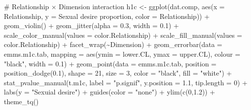 \documentclass[
  bookmarksnumbered]{article}
\newenvironment{Shaded}{\begin{snugshade}}{\end{snugshade}}
\newcommand{\AttributeTok}[1]{\textcolor[rgb]{0.80,0.80,0.80}{#1}}
\newcommand{\CommentTok}[1]{\textcolor[rgb]{0.50,0.62,0.50}{#1}}
\newcommand{\DecValTok}[1]{\textcolor[rgb]{0.86,0.86,0.80}{#1}}
\newcommand{\FloatTok}[1]{\textcolor[rgb]{0.75,0.75,0.82}{#1}}
\newcommand{\FunctionTok}[1]{\textcolor[rgb]{0.94,0.94,0.56}{#1}}
\newcommand{\NormalTok}[1]{\textcolor[rgb]{0.80,0.80,0.80}{#1}}
\newcommand{\OtherTok}[1]{\textcolor[rgb]{0.94,0.94,0.56}{#1}}
\newcommand{\SpecialCharTok}[1]{\textcolor[rgb]{0.86,0.64,0.64}{#1}}
\newcommand{\StringTok}[1]{\textcolor[rgb]{0.80,0.58,0.58}{#1}}
\begin{document}
\begin{Shaded}
\begin{Highlighting}[]
\CommentTok{\# Relationship × Dimension interaction}
\NormalTok{h1c }\OtherTok{\textless{}{-}} \FunctionTok{ggplot}\NormalTok{(dat.comp, }\FunctionTok{aes}\NormalTok{(}\AttributeTok{x =}\NormalTok{ Relationship, }\AttributeTok{y =} \StringTok{\textasciigrave{}}\AttributeTok{Sexual desire proportion}\StringTok{\textasciigrave{}}\NormalTok{, }\AttributeTok{color =}\NormalTok{ Relationship)) }\SpecialCharTok{+}
  \FunctionTok{geom\_violin}\NormalTok{() }\SpecialCharTok{+}
  \FunctionTok{geom\_jitter}\NormalTok{(}\AttributeTok{alpha =} \FloatTok{0.3}\NormalTok{, }\AttributeTok{width =} \FloatTok{0.1}\NormalTok{) }\SpecialCharTok{+}
  \FunctionTok{scale\_color\_manual}\NormalTok{(}\AttributeTok{values =}\NormalTok{ color.Relationship) }\SpecialCharTok{+}
  \FunctionTok{scale\_fill\_manual}\NormalTok{(}\AttributeTok{values =}\NormalTok{ color.Relationship) }\SpecialCharTok{+}
  \FunctionTok{facet\_wrap}\NormalTok{(}\SpecialCharTok{\textasciitilde{}}\NormalTok{Dimension) }\SpecialCharTok{+}
  \FunctionTok{geom\_errorbar}\NormalTok{(}\AttributeTok{data =}\NormalTok{ emms.m1c.tab, }
                \AttributeTok{mapping =} \FunctionTok{aes}\NormalTok{(}\AttributeTok{ymin =}\NormalTok{ lower.CL, }\AttributeTok{ymax =}\NormalTok{ upper.CL), }
                \AttributeTok{colour =} \StringTok{"black"}\NormalTok{, }\AttributeTok{width =} \FloatTok{0.1}\NormalTok{) }\SpecialCharTok{+}
  \FunctionTok{geom\_point}\NormalTok{(}\AttributeTok{data =}\NormalTok{ emms.m1c.tab, }
             \AttributeTok{position =} \FunctionTok{position\_dodge}\NormalTok{(}\FloatTok{0.1}\NormalTok{), }
             \AttributeTok{shape =} \DecValTok{21}\NormalTok{, }\AttributeTok{size =} \DecValTok{3}\NormalTok{,}
             \AttributeTok{color =} \StringTok{"black"}\NormalTok{, }\AttributeTok{fill =} \StringTok{"white"}\NormalTok{) }\SpecialCharTok{+}
  \FunctionTok{stat\_pvalue\_manual}\NormalTok{(t.m1c, }
                     \AttributeTok{label =} \StringTok{"p.signif"}\NormalTok{, }
                     \AttributeTok{y.position =} \FloatTok{1.1}\NormalTok{, }
                     \AttributeTok{tip.length =} \DecValTok{0}\NormalTok{) }\SpecialCharTok{+}
  \FunctionTok{labs}\NormalTok{(}\AttributeTok{y =} \StringTok{"Sexuial desire"}\NormalTok{) }\SpecialCharTok{+}
  \FunctionTok{guides}\NormalTok{(}\AttributeTok{color =} \StringTok{"none"}\NormalTok{) }\SpecialCharTok{+}
  \FunctionTok{ylim}\NormalTok{(}\FunctionTok{c}\NormalTok{(}\DecValTok{0}\NormalTok{,}\FloatTok{1.2}\NormalTok{)) }\SpecialCharTok{+}
  \FunctionTok{theme\_tq}\NormalTok{()}


\end{Highlighting}
\end{Shaded}
\end{document}
